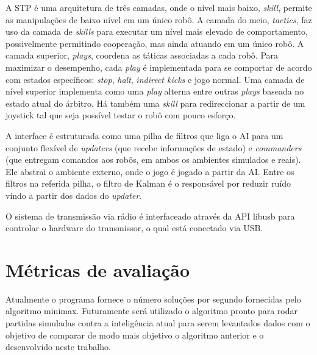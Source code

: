 A STP é uma arquitetura de três camadas, onde o nível mais baixo, \textit{skill},
permite as manipulações de baixo nível em um único robô. A camada do meio,
\textit{tactics}, faz uso da camada de \textit{skills} para executar um nível
mais elevado de comportamento, possivelmente permitindo cooperação, mas ainda
atuando em um único robô. A camada superior, \textit{plays}, coordena as táticas
associadas a cada robô. Para maximizar o desempenho, cada \textit{play} é
implementada para se comportar de acordo com estados específicos:
\textit{stop}, \textit{halt}, \textit{indirect kicks} e jogo normal.
Uma camada de nível superior implementa como uma \textit{play} alterna entre
outras \textit{plays} baseada no estado atual do árbitro.
Há também uma \textit{skill} para redireccionar a partir de um joystick tal que
seja possível testar o robô com pouco esforço.

A interface é estruturada como uma pilha de filtros que liga o AI para um
conjunto flexível de \textit{updaters} (que recebe informações de estado) e
\textit{commanders} (que entregam comandos aos robôs, em ambos os ambientes simulados
e reais). Ele abstrai o ambiente externo, onde o jogo é jogado a partir da AI\@.
Entre os filtros na referida pilha, o filtro de Kalman é o responsável por
reduzir ruído vindo a partir dos dados do \textit{updater}.

O sistema de transmissão via rádio é interfaceado através da  API libusb para
controlar o hardware do transmissor, o qual está conectado via USB\@.

\section{Métricas de avaliação}\label{sec:metricas}

Atualmente o programa fornece o número soluções por segundo fornecidas pelo
algoritmo minimax. Futuramente será utilizado o algoritmo pronto para rodar
partidas simuladas contra a inteligência atual para serem levantados dados com
o objetivo de comparar de modo mais objetivo o algoritmo anterior e o
desenvolvido neste trabalho.
